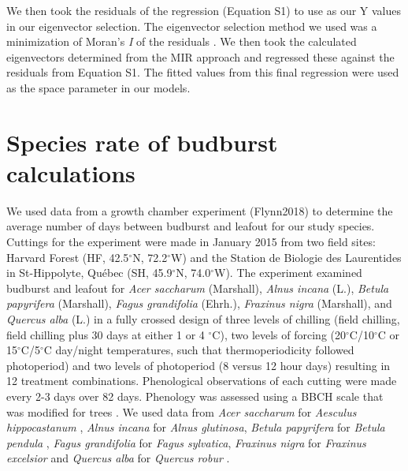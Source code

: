 \documentclass{article}\usepackage[]{graphicx}\usepackage[]{color}
\begin{document}
We then took the residuals of the regression (Equation S1) to use as our Y values in our eigenvector selection. The eigenvector selection method we used was a minimization of Moran's \textit{I} of the residuals \citep[][MIR]{Baumen2017}. We then took the calculated eigenvectors determined from the MIR approach and regressed these against the residuals from Equation S1. The fitted values from this final regression were used as the space parameter in our models.


\section*{Species rate of budburst calculations}
We used data from a growth chamber experiment (Flynn2018) to determine the average number of days between budburst and leafout for our study species. Cuttings for the experiment were made in January 2015 from two field sites: Harvard Forest (HF, 42.5$^{\circ}$N, 72.2$^{\circ}$W) and the Station de Biologie des Laurentides in St-Hippolyte, Qu\'ebec (SH, 45.9$^{\circ}$N, 74.0$^{\circ}$W). The experiment examined budburst and leafout for \textit{Acer saccharum} (Marshall), \textit{Alnus incana} (L.), \textit{Betula papyrifera} (Marshall), \textit{Fagus grandifolia} (Ehrh.), \textit{Fraxinus nigra} (Marshall), and \textit{Quercus alba} (L.) in a fully crossed design of three levels of chilling (field chilling, field chilling plus 30 days at either 1 or 4 $^{\circ}$C), two levels of forcing (20$^{\circ}$C/10$^{\circ}$C or 15$^{\circ}$C/5$^{\circ}$C day/night temperatures, such that thermoperiodicity followed photoperiod) and two levels of photoperiod (8 versus 12 hour days) resulting in 12 treatment combinations. Phenological observations of each cutting were made every 2-3 days over 82 days. Phenology was assessed using a BBCH scale that was modified for trees \citep{Finn2007}. We used data from \textit{Acer saccharum} for \textit{Aesculus hippocastanum} \citep{Buerki2010}, \textit{Alnus incana} for \textit{Alnus glutinosa}, \textit{Betula papyrifera} for \textit{Betula pendula} \citep{Wang2016}, \textit{Fagus grandifolia} for \textit{Fagus sylvatica}, \textit{Fraxinus nigra} for \textit{Fraxinus excelsior} and \textit{Quercus alba} for \textit{Quercus robur} \citep{Hipp2017}.


\end{document}
